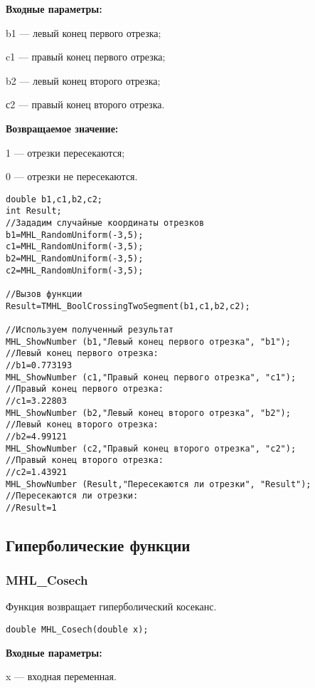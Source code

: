 \documentclass[a4paper,12pt]{article}
\begin{document}
\textbf{Входные параметры:}  
 
b1 --- левый конец первого отрезка;
 
c1 --- правый конец первого отрезка;
 
b2 --- левый конец второго отрезка;
 
с2 --- правый конец второго отрезка.

\textbf{Возвращаемое значение:}
 
1 --- отрезки пересекаются;
 
0 --- отрезки не пересекаются.


\begin{lstlisting}[label=code_use_TMHL_BoolCrossingTwoSegment,caption=Пример использования]
double b1,c1,b2,c2;
int Result;
//Зададим случайные координаты отрезков
b1=MHL_RandomUniform(-3,5);
c1=MHL_RandomUniform(-3,5);
b2=MHL_RandomUniform(-3,5);
c2=MHL_RandomUniform(-3,5);

//Вызов функции
Result=TMHL_BoolCrossingTwoSegment(b1,c1,b2,c2);

//Используем полученный результат
MHL_ShowNumber (b1,"Левый конец первого отрезка", "b1");
//Левый конец первого отрезка:
//b1=0.773193
MHL_ShowNumber (c1,"Правый конец первого отрезка", "c1");
//Правый конец первого отрезка:
//c1=3.22803
MHL_ShowNumber (b2,"Левый конец второго отрезка", "b2");
//Левый конец второго отрезка:
//b2=4.99121
MHL_ShowNumber (c2,"Правый конец второго отрезка", "c2");
//Правый конец второго отрезка:
//c2=1.43921
MHL_ShowNumber (Result,"Пересекаются ли отрезки", "Result");
//Пересекаются ли отрезки:
//Result=1
\end{lstlisting}

\subsection{Гиперболические функции}

\subsubsection{MHL\_Cosech}\label{MHL_Cosech}

Функция возвращает гиперболический косеканс.


\begin{lstlisting}[label=code_syntax_MHL_Cosech,caption=Синтаксис]
double MHL_Cosech(double x);
\end{lstlisting}

\textbf{Входные параметры:}

 x --- входная переменная.
\end{document}

